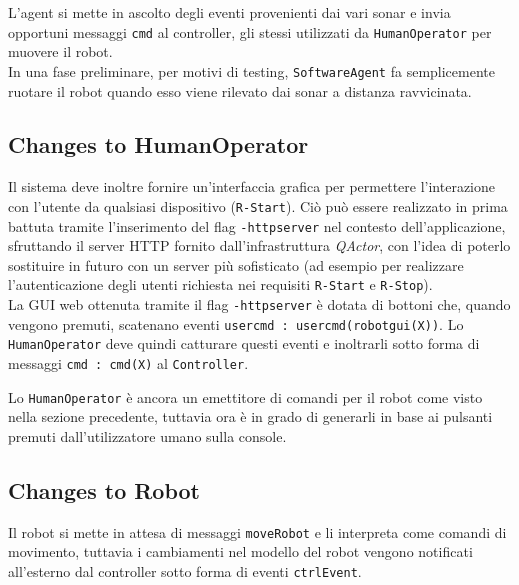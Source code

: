 \documentclass{../llncs}
\newcommand{\codescript}[1]{{\mbox{\small{\texttt{#1}}}}\xspace}
\newcommand{\code}[1]{{\color{blue}\small{\texttt{#1}}}}
\newcommand{\qa}{\textsf{\textit{QActor}}\xspace}
\newcommand{\labelssec}[1]{\label{ssec:#1}}
\begin{document}
L'agent si mette in ascolto degli eventi provenienti dai vari sonar e invia opportuni messaggi \codescript{cmd} al controller, gli stessi utilizzati da \texttt{HumanOperator} per muovere il robot.\\

In una fase preliminare, per motivi di testing, \texttt{SoftwareAgent} fa semplicemente ruotare il robot quando esso viene rilevato dai sonar a distanza ravvicinata.\\



\subsection{Changes to HumanOperator}
\labelssec{humanOpPA}
Il sistema deve inoltre fornire un'interfaccia grafica per permettere l'interazione con l'utente da qualsiasi dispositivo (\code{R-Start}). Ciò può essere realizzato in prima battuta tramite l'inserimento del flag \codescript{-httpserver} nel contesto dell'applicazione, sfruttando il server HTTP fornito dall'infrastruttura \qa, con l'idea di poterlo sostituire in futuro con un server più sofisticato (ad esempio per realizzare l'autenticazione degli utenti richiesta nei requisiti \code{R-Start} e \code{R-Stop}).\\



La GUI web ottenuta tramite il flag \codescript{-httpserver} è dotata di bottoni che, quando vengono premuti, scatenano eventi \codescript{usercmd : usercmd(robotgui(X))}. Lo \texttt{HumanOperator} deve quindi catturare questi eventi e inoltrarli sotto forma di messaggi \codescript{cmd : cmd(X)} al \texttt{Controller}.

Lo \texttt{HumanOperator} è ancora un emettitore di comandi per il robot come visto nella sezione precedente, tuttavia ora è in grado di generarli in base ai pulsanti premuti dall'utilizzatore umano sulla console.\\



\subsection{Changes to Robot}
Il robot si mette in attesa di messaggi \codescript{moveRobot} e li interpreta come comandi di movimento, tuttavia i cambiamenti nel modello del robot vengono notificati all'esterno dal controller sotto forma di eventi \codescript{ctrlEvent}.
\end{document}
